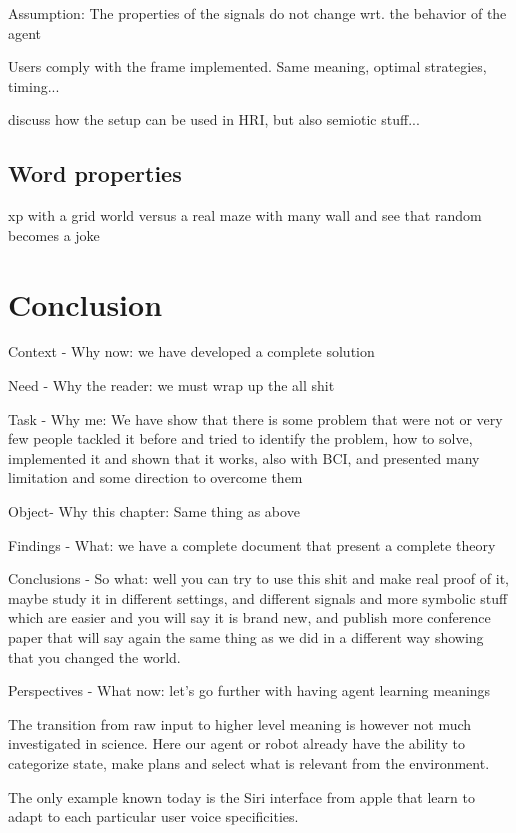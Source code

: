 Assumption: The properties of the signals do not change wrt. the behavior of the agent

Users comply with the frame implemented. Same meaning, optimal strategies, timing...

discuss how the setup can be used in HRI, but also semiotic stuff...

\section{Word properties}
xp with a grid world versus a real maze with many wall and see that random becomes a joke

\chapter{Conclusion}
\minitoc

Context - Why now: we have developed a complete solution

Need - Why the reader: we must wrap up the all shit 

Task - Why me: We have show that there is some problem that were not or very few people tackled it before and tried to identify the problem, how to solve, implemented it and shown that it works, also with BCI, and presented many limitation and some direction to overcome them

Object- Why this chapter: Same thing as above

Findings - What: we have a complete document that present a complete theory

Conclusions - So what: well you can try to use this shit and make real proof of it, maybe study it in different settings, and different signals and more symbolic stuff which are easier and you will say it is brand new, and publish more conference paper that will say again the same thing as we did in a different way showing that you changed the world.

Perspectives - What now: let's go further with having agent learning meanings

The transition from raw input to higher level meaning is however not much investigated in science. Here our agent or robot already have the ability to categorize state, make plans and select what is relevant from the environment.

The only example known today is the Siri interface from apple that learn to adapt to each particular user voice specificities.






